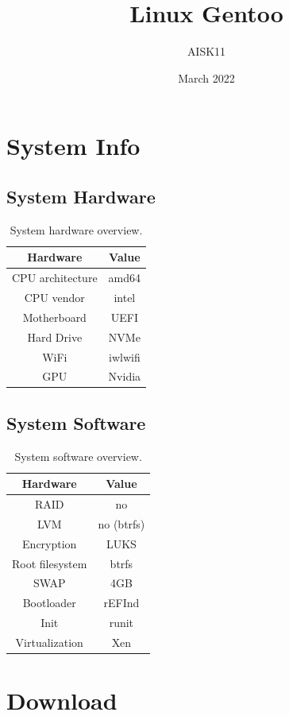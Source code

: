 \documentclass[10pt, a4paper, onecolumn, oneside, titlepage, openany]{book}
\title{\textbf{Linux Gentoo}}
\author{AISK11}
\date{March 2022}
\begin{document}
\maketitle
\tableofcontents


\chapter{System Info}
\section{System Hardware}
\begin{table}[h!]
\centering
\begin{tabular}{|c|c|}
    \hline
    \textbf{Hardware} & \textbf{Value} \\
    \hline
    CPU architecture & amd64\\
    CPU vendor & intel\\
    Motherboard & UEFI\\
    Hard Drive & NVMe\\
    WiFi & iwlwifi\\
    GPU & Nvidia\\
    \hline
\end{tabular}
\caption{System hardware overview.}
\label{table:1}
\end{table}

\section{System Software}
\begin{table}[h!]
\centering
\begin{tabular}{|c|c|}
    \hline
    \textbf{Hardware} & \textbf{Value} \\
    \hline
    RAID & no\\
    LVM & no (btrfs)\\
    Encryption & LUKS\\
    Root filesystem & btrfs\\
    SWAP & 4GB\\
    Bootloader & rEFInd\\
    Init & runit\\
    Virtualization & Xen\\
    \hline
\end{tabular}
\caption{System software overview.}
\label{table:2}
\end{table}


\chapter{Download}
\end{document}
